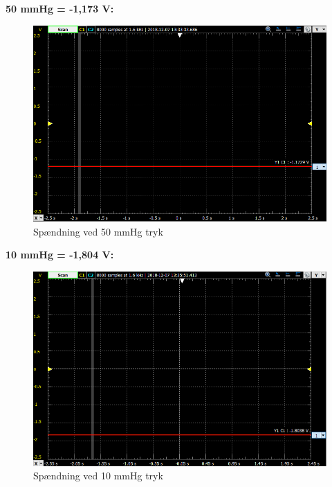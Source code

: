 \vspace{0.2 cm}

\textbf{50 mmHg  =  -1,173 V:}

\vspace{0.2 cm}

\begin{figure}[h!]
	\centering
	\includegraphics[width=1\linewidth]{Hardwaredesign/mmHg50}
	\caption{Spændning ved 50 mmHg tryk}
	\label{fig:50mmHg}
\end{figure}

\vspace{0.2 cm}

\textbf{10 mmHg  =  -1,804 V:}

\vspace{0.2 cm}

\begin{figure}[h!]
	\centering
	\includegraphics[width=1\linewidth]{Hardwaredesign/mmHg10}
	\caption{Spændning ved 10 mmHg tryk}
	\label{fig:10mmHg}
\end{figure}

